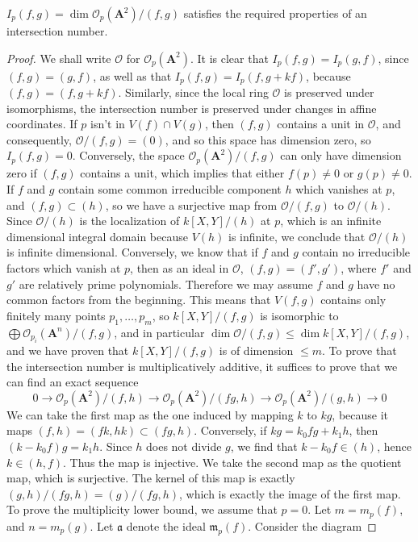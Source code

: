 \begin{theorem}
    $I_p(f,g) = \dim \mathcal{O}_p(\mathbf{A}^2)/(f,g)$ satisfies the required properties of an intersection number.
\end{theorem}
\begin{proof}
    We shall write $\mathcal{O}$ for $\mathcal{O}_p(\mathbf{A}^2)$. It is clear that $I_p(f,g) = I_p(g,f)$, since $(f,g) = (g,f)$, as well as that $I_p(f,g) = I_p(f,g + kf)$, because $(f,g) = (f,g + kf)$. Similarly, since the local ring $\mathcal{O}$ is preserved under isomorphisms, the intersection number is preserved under changes in affine coordinates. If $p$ isn't in $V(f) \cap V(g)$, then $(f,g)$ contains a unit in $\mathcal{O}$, and consequently, $\mathcal{O}/(f,g) = (0)$, and so this space has dimension zero, so $I_p(f,g) = 0$. Conversely, the space $\mathcal{O}_p(\mathbf{A}^2)/(f,g)$ can only have dimension zero if $(f,g)$ contains a unit, which implies that either $f(p) \neq 0$ or $g(p) \neq 0$. If $f$ and $g$ contain some common irreducible component $h$ which vanishes at $p$, and $(f,g) \subset (h)$, so we have a surjective map from $\mathcal{O}/(f,g)$ to $\mathcal{O}/(h)$. Since $\mathcal{O}/(h)$ is the localization of $k[X,Y]/(h)$ at $p$, which is an infinite dimensional integral domain because $V(h)$ is infinite, we conclude that $\mathcal{O}/(h)$ is infinite dimensional. Conversely, we know that if $f$ and $g$ contain no irreducible factors which vanish at $p$, then as an ideal in $\mathcal{O}$, $(f,g) = (f',g')$, where $f'$ and $g'$ are relatively prime polynomials. Therefore we may assume $f$ and $g$ have no common factors from the beginning. This means that $V(f,g)$ contains only finitely many points $p_1, \dots, p_m$, so $k[X,Y]/(f,g)$ is isomorphic to $\bigoplus \mathcal{O}_{p_i}(\mathbf{A}^n)/(f,g)$, and in particular $\dim \mathcal{O}/(f,g) \leq \dim k[X,Y]/(f,g)$, and we have proven that $k[X,Y]/(f,g)$ is of dimension $\leq m$. To prove that the intersection number is multiplicatively additive, it suffices to prove that we can find an exact sequence
    \[ 0 \to \mathcal{O}_p(\mathbf{A}^2)/(f,h) \to \mathcal{O}_p(\mathbf{A}^2)/(fg,h) \to \mathcal{O}_p(\mathbf{A}^2)/(g,h) \to 0 \]
    We can take the first map as the one induced by mapping $k$ to $kg$, because it maps $(f,h) = (fk,hk) \subset (fg,h)$. Conversely, if $kg = k_0fg + k_1h$, then $(k - k_0f)g = k_1h$. Since $h$ does not divide $g$, we find that $k - k_0f \in (h)$, hence $k \in (h,f)$. Thus the map is injective. We take the second map as the quotient map, which is surjective. The kernel of this map is exactly $(g,h)/(fg,h) = (g)/(fg,h)$, which is exactly the image of the first map. To prove the multiplicity lower bound, we assume that $p = 0$. Let $m = m_p(f)$, and $n = m_p(g)$. Let $\mathfrak{a}$ denote the ideal $\mathfrak{m}_p(f)$. Consider the diagram

\end{proof}
